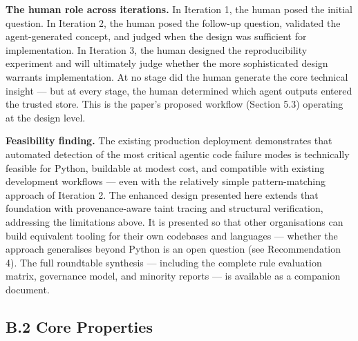 \documentclass[a4paper,11pt]{report}
\begin{document}
\textbf{The human role across iterations.} In Iteration 1, the human
posed the initial question. In Iteration 2, the human posed the
follow-up question, validated the agent-generated concept, and judged
when the design was sufficient for implementation. In Iteration 3, the
human designed the reproducibility experiment and will ultimately judge
whether the more sophisticated design warrants implementation. At no
stage did the human generate the core technical insight --- but at every
stage, the human determined which agent outputs entered the trusted
store. This is the paper's proposed workflow (Section 5.3) operating at
the design level.

\textbf{Feasibility finding.} The existing production deployment
demonstrates that automated detection of the most critical agentic code
failure modes is technically feasible for Python, buildable at modest
cost, and compatible with existing development workflows --- even with
the relatively simple pattern-matching approach of Iteration 2. The
enhanced design presented here extends that foundation with
provenance-aware taint tracing and structural verification, addressing
the limitations above. It is presented so that other organisations can
build equivalent tooling for their own codebases and languages ---
whether the approach generalises beyond Python is an open question (see
Recommendation 4). The full roundtable synthesis --- including the
complete rule evaluation matrix, governance model, and minority reports
--- is available as a companion document.

\hypertarget{b.2-core-properties}{%
\subsection{B.2 Core Properties}\label{b.2-core-properties}}
\end{document}
